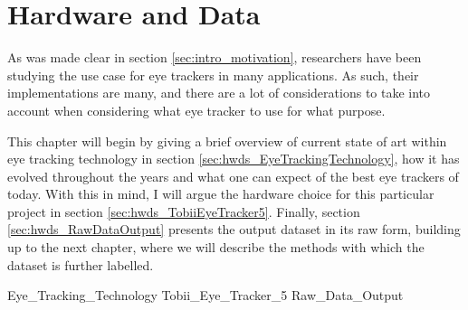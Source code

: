 \chapter{Hardware and Data} \label{ch:hwds}

As was made clear in section \ref{sec:intro_motivation}, researchers have been studying the use case for eye trackers in many applications. As such, their implementations are many, and there are a lot of considerations to take into account when considering what eye tracker to use for what purpose.

This chapter will begin by giving a brief overview of current state of art within eye tracking technology in section \ref{sec:hwds_EyeTrackingTechnology}, how it has evolved throughout the years and what one can expect of the best eye trackers of today. With this in mind, I will argue the hardware choice for this particular project in section \ref{sec:hwds_TobiiEyeTracker5}. Finally, section \ref{sec:hwds_RawDataOutput} presents the output dataset in its raw form, building up to the next chapter, where we will describe the methods with which the dataset is further labelled.

{Eye_Tracking_Technology}
{Tobii_Eye_Tracker_5}
{Raw_Data_Output}